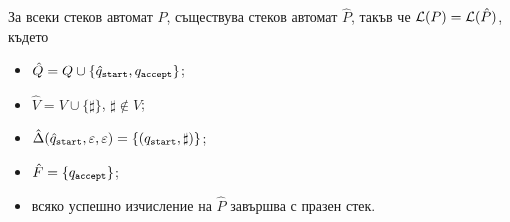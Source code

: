 \begin{prop}
  За всеки стеков автомат $P$,
  съществува стеков автомат $\hat{P}$, такъв че $\mathcal{L}(P) = \mathcal{L}(\hat{P})$,
  където
  \begin{itemize}
  \item
    $\hat{Q} = Q \cup \{\hat{q}_{\texttt{start}}, q_{\texttt{accept}}\}$;
  \item
    $\hat{V} = V \cup \{\sharp\}$, $\sharp \not\in V$;
  \item
    $\hat{\Delta}(\hat{q}_{\texttt{start}},\varepsilon,\varepsilon) = \{(q_{\texttt{start}}, \sharp)\}$;
  \item
    $\hat{F} = \{q_{\texttt{accept}}\}$;
  \item
    всяко успешно изчисление на $\hat{P}$ завършва с празен стек.
  \end{itemize}
\end{prop}


